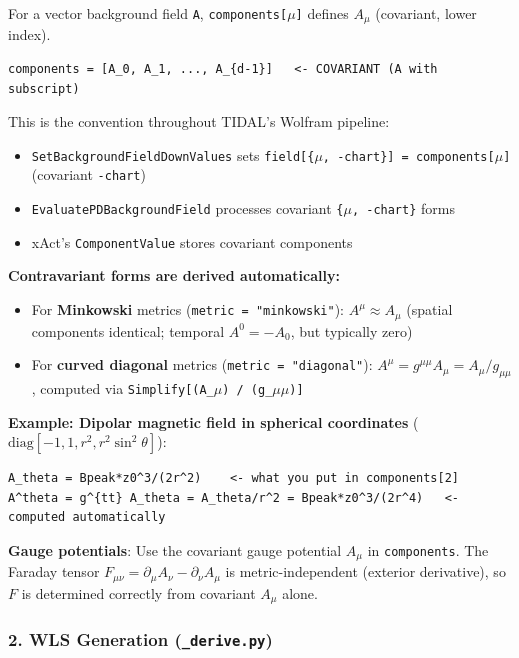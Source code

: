 For a vector background field \texttt{A}, \texttt{components[$\mu$]} defines $A_\mu$ (covariant, lower index).

\begin{lstlisting}
components = [A_0, A_1, ..., A_{d-1}]   <- COVARIANT (A with subscript)
\end{lstlisting}

This is the convention throughout TIDAL's Wolfram pipeline:
\begin{itemize}
  \item \texttt{SetBackgroundFieldDownValues} sets \texttt{field[\{$\mu$, -chart\}] = components[$\mu$]} (covariant \texttt{-chart})
  \item \texttt{EvaluatePDBackgroundField} processes covariant \texttt{\{$\mu$, -chart\}} forms
  \item xAct's \texttt{ComponentValue} stores covariant components
\end{itemize}

\textbf{Contravariant forms are derived automatically:}
\begin{itemize}
  \item For \textbf{Minkowski} metrics (\texttt{metric = "minkowski"}): $A^\mu \approx A_\mu$ (spatial components identical; temporal $A^0 = -A_0$, but typically zero)
  \item For \textbf{curved diagonal} metrics (\texttt{metric = "diagonal"}): $A^\mu = g^{\mu\mu} A_\mu = A_\mu / g_{\mu\mu}$, computed via \texttt{Simplify[(A\_$\mu$) / (g\_$\mu\mu$)]}
\end{itemize}

\textbf{Example: Dipolar magnetic field in spherical coordinates} ($\text{diag}[-1, 1, r^2, r^2\sin^2\theta]$):
\begin{lstlisting}
A_theta = Bpeak*z0^3/(2r^2)    <- what you put in components[2]
A^theta = g^{tt} A_theta = A_theta/r^2 = Bpeak*z0^3/(2r^4)   <- computed automatically
\end{lstlisting}

\textbf{Gauge potentials}: Use the covariant gauge potential $A_\mu$ in \texttt{components}.
The Faraday tensor $F_{\mu\nu} = \partial_\mu A_\nu - \partial_\nu A_\mu$ is metric-independent (exterior derivative),
so $F$ is determined correctly from covariant $A_\mu$ alone.

\subsubsection{2. WLS Generation (\texttt{\_derive.py})}
\label{sec:bg-wls-gen}

